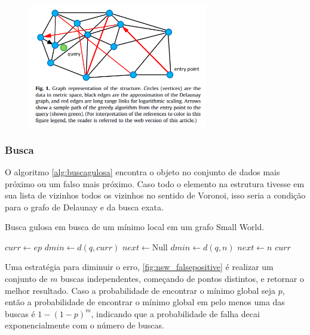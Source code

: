 \begin{figure}
    \centering
    \includegraphics[width=0.7\textwidth]{imgs/navigablesmallworld_graph.png}
    \label{fig:navsmallworld}
\end{figure}

\subsubsection{Busca}

O algoritmo \cref{alg:buscagulosa} encontra o objeto no conjunto de dados mais próximo ou um falso mais próximo. Caso todo o elemento na estrutura tivesse em sua lista de vizinhos todos os vizinhos no sentido de Voronoi, isso seria a condição para o grafo de Delaunay e da busca exata.

\begin{algorithm}
\caption{Busca gulosa em busca de um mínimo local em um grafo Small World.}
\label{alg:buscagulosa}
\begin{algorithmic}[1]
    \State $curr \gets ep$
    \State $dmin \gets d(q, curr)$
    \State $next \gets \text{Null}$
            \State $dmin \gets d(q, n)$
            \State $next \gets n$
        \EndIf
    \EndFor
        \State \Return $curr$ 
    \Else
        \State \Return {}
    \EndIf
\EndProcedure
\end{algorithmic}
\end{algorithm}

Uma estratégia para diminuir o erro, \cref{fig:nsw_falsepositive} é realizar um conjunto de $m$ buscas independentes, começando de pontos distintos, e retornar o melhor resultado. Caso a probabilidade de encontrar o mínimo global seja $p$, então a probabilidade de encontrar o mínimo global em pelo menos uma das buscas é $1 - (1 - p)^m$, indicando que a probabilidade de falha decai exponencialmente com o número de buscas.


